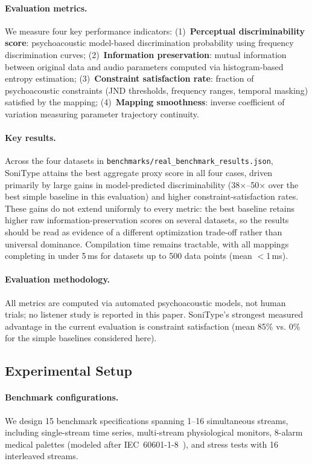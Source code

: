 \documentclass[sigchi, nonacm]{acmart}
\begin{document}
\paragraph{Evaluation metrics.} We measure four key performance indicators: (1)~\textbf{Perceptual discriminability score}: psychoacoustic model-based discrimination probability using frequency discrimination curves; (2)~\textbf{Information preservation}: mutual information between original data and audio parameters computed via histogram-based entropy estimation; (3)~\textbf{Constraint satisfaction rate}: fraction of psychoacoustic constraints (JND thresholds, frequency ranges, temporal masking) satisfied by the mapping; (4)~\textbf{Mapping smoothness}: inverse coefficient of variation measuring parameter trajectory continuity.

\paragraph{Key results.} Across the four datasets in \texttt{benchmarks/real\_benchmark\_results.json}, SoniType attains the best aggregate proxy score in all four cases, driven primarily by large gains in model-predicted discriminability (38$\times$--50$\times$ over the best simple baseline in this evaluation) and higher constraint-satisfaction rates. These gains do not extend uniformly to every metric: the best baseline retains higher raw information-preservation scores on several datasets, so the results should be read as evidence of a different optimization trade-off rather than universal dominance. Compilation time remains tractable, with all mappings completing in under 5\,ms for datasets up to 500 data points (mean $<$1\,ms).

\paragraph{Evaluation methodology.} All metrics are computed via automated psychoacoustic models, not human trials; no listener study is reported in this paper. SoniType's strongest measured advantage in the current evaluation is constraint satisfaction (mean 85\% vs. 0\% for the simple baselines considered here).

\subsection{Experimental Setup}

\paragraph{Benchmark configurations.} We design 15 benchmark specifications spanning 1--16 simultaneous streams, including single-stream time series, multi-stream physiological monitors, 8-alarm medical palettes (modeled after IEC~60601-1-8~\cite{iec60601}), and stress tests with 16 interleaved streams.
\end{document}
